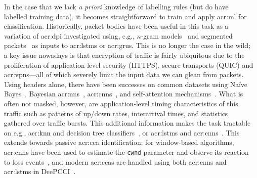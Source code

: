 In the case that we lack \emph{a priori} knowledge of labelling rules (but do have labelled training data), it becomes straightforward to train and apply \gls{acr:ml} for classification.
Historically, packet bodies have been useful in this task as a variation of \gls{acr:dpi} investigated using, e.g., $n$-gram models~\parencite{DBLP:journals/ton/YunW0Z16} and segmented packets~\parencite{DBLP:conf/iwqos/LiXNZX18} as inputs to \glspl{acr:lstm} or \glspl{acr:gru}.
This is no longer the case in the wild; a key issue nowadays is that encryption of traffic is fairly ubiquitous due to the proliferation of application-level security (HTTPS), secure transports (QUIC) and \glspl{acr:vpn}---all of which severely limit the input data we can glean from packets.
Using headers alone, there have been successes on common datasets using Na\"{i}ve Bayes~\parencite{DBLP:conf/sigmetrics/MooreZ05}, Bayesian \glspl{acr:nn}~\parencite{DBLP:journals/tnn/AuldMG07}, \glspl{acr:cnn}~\parencite{DBLP:journals/soco/LotfollahiSZS20}, and self-attention mechanisms~\parencite{DBLP:conf/sigcomm/Xie0JDSLSX20}.
What is often not masked, however, are application-level timing characteristics of this traffic such as patterns of up/down rates, interarrival times, and statistics gathered over traffic bursts.
This additional information makes the task tractable on e.g., \gls{acr:knn} and decision tree classifiers~\parencite{DBLP:conf/icissp/Draper-GilLMG16}, or \glspl{acr:lstm} and \glspl{acr:cnn}~\parencite{DBLP:journals/tnsm/AcetoCMP19}.
This extends towards passive \gls{acr:cca} identification: for window-based algorithms, \glspl{acr:cnn} have been used to estimate the \texttt{cwnd} parameter and observe its reaction to loss events~\parencite{DBLP:conf/icccn/HagosEYK18}, and modern \glspl{acr:cca} are handled using both \glspl{acr:cnn} and \glspl{acr:lstm} in DeePCCI~\parencite{DBLP:conf/sigcomm/SanderRHW19}.
